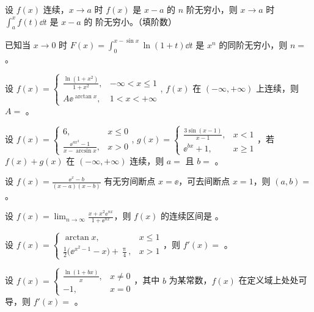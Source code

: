 \begin{ti}
	设 $f(x)$ 连续，$x \to a$ 时 $f(x)$ 是 $x - a$ 的 $n$ 阶无穷小，则 $x \to a$ 时 $\int_a^x f(t) \dd{t}$ 是 $x - a$ 的 \hua{} 阶无穷小。（填阶数）
\end{ti}

\begin{ti}
	已知当 $x \to 0$ 时 $F(x) = \int_0^{x - \sin x} \ln(1+t) \dd{t}$ 是 $x^n$ 的同阶无穷小，则 $n = $ \hua。
\end{ti}

\begin{ti}
	设 $f(x) = \begin{cases}
		\frac{\ln(1 + x^2)}{1 + x^2}, & - \infty < x \leq 1 \\
		A \ee^{\arctan x}, & 1 < x < +\infty
	\end{cases}$, $f(x)$ 在 $(-\infty,+\infty)$ 上连续，则 $A = $ \hua。
\end{ti}

\begin{ti}
	设 $f(x) = \begin{cases}
		6, & x \leq 0 \\
		\frac{\ee^{ax^3} - 1}{x - \arcsin x}, & x > 0
	\end{cases}$, $g(x) = \begin{cases}
		\frac{3 \sin(x - 1)}{x - 1}, & x < 1 \\
		\ee^{bx} + 1, & x \geq 1
	\end{cases}$，若 $f(x) + g(x)$ 在 $(-\infty,+\infty)$ 连续，则 $a = $ \hua{} 且 $b = $ \hua。
\end{ti}

\begin{ti}
	设 $f(x) = \frac{\ee^x - b}{(x-a) (x-b)}$ 有无穷间断点 $x = \ee$，可去间断点 $x = 1$，则 $(a,b) = $ \hua。
\end{ti}

\begin{ti}
	设 $f(x) = \lim_{n \to \infty} \frac{x + x^2 \ee^{nx}}{1 + \ee^{nx}}$，则 $f(x)$ 的连续区间是 \hua。
\end{ti}

\begin{ti}
	设 $f(x) = \begin{cases}
		\arctan x, & x \leq 1 \\
		\frac{1}{2} \bigl( \ee^{x^2 - 1} - x \bigr) + \frac{\uppi}{4}, & x > 1
	\end{cases}$，则 $f'(x) = $ \hua。
\end{ti}

\begin{ti}
	设 $f(x) = \begin{cases}
		\frac{\ln(1 + bx)}{x}, & x \ne 0 \\
		-1, & x = 0
	\end{cases}$，其中 $b$ 为某常数，$f(x)$ 在定义域上处处可导，则 $f'(x) = $ \hua。
\end{ti}

